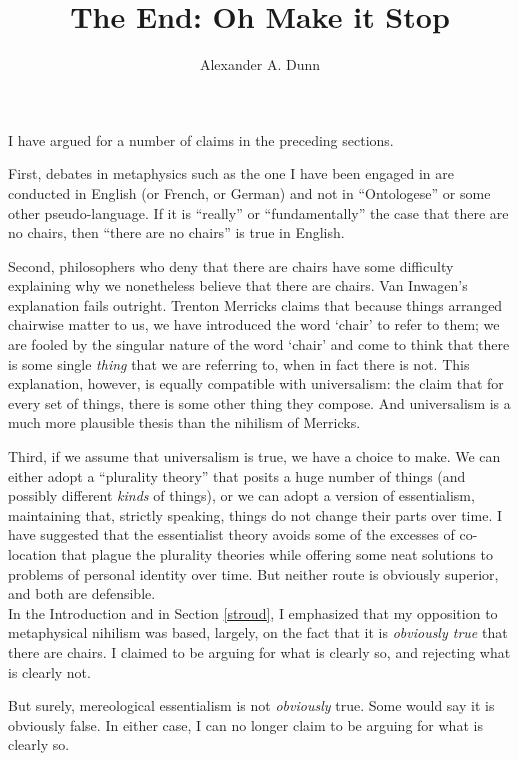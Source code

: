 \documentclass[11pt]{article}
\title{The End: Oh Make it Stop}
\author{Alexander A. Dunn}
\begin{document}
\ifstandalone
\maketitle
\begin{spacing}{1.5}
\fi

I have argued for a number of claims in the preceding sections.

First, debates in metaphysics such as the one I have been engaged in
are conducted in English (or French, or German) and not in
``Ontologese'' or some other pseudo-language.  If it is ``really'' or
``fundamentally'' the case that there are no chairs, then ``there are
no chairs'' is true in English.

Second, philosophers who deny that there are chairs have some
difficulty explaining why we nonetheless believe that there are
chairs.  Van Inwagen's explanation fails outright.  Trenton Merricks
claims that because things arranged chairwise matter to us, we have
introduced the word `chair' to refer to them; we are fooled by the
singular nature of the word `chair' and come to think that there is
some single {\em thing} that we are referring to, when in fact there
is not.  This explanation, however, is equally compatible with
universalism: the claim that for every set of things, there is some
other thing they compose.  And universalism is a much more plausible
thesis than the nihilism of Merricks.

Third, if we assume that universalism is true, we have a choice to
make.  We can either adopt a ``plurality theory'' that posits a huge
number of things (and possibly different {\em kinds} of things), or we
can adopt a version of essentialism, maintaining that, strictly
speaking, things do not change their parts over time.  I have
suggested that the essentialist theory avoids some of the excesses of
co-location that plague the plurality theories while offering some
neat solutions to problems of personal identity over time.  But
neither route is obviously superior, and both are defensible.\\

In the Introduction and in Section \ref{stroud}, I emphasized that my
opposition to metaphysical nihilism was based, largely, on the fact
that it is {\em obviously true} that there are chairs.  I claimed to
be arguing for what is clearly so, and rejecting what is clearly not.

But surely, mereological essentialism is not {\em obviously} true.
Some would say it is obviously false.  In either case, I can no longer
claim to be arguing for what is clearly so.


\end{spacing}
\end{document}
